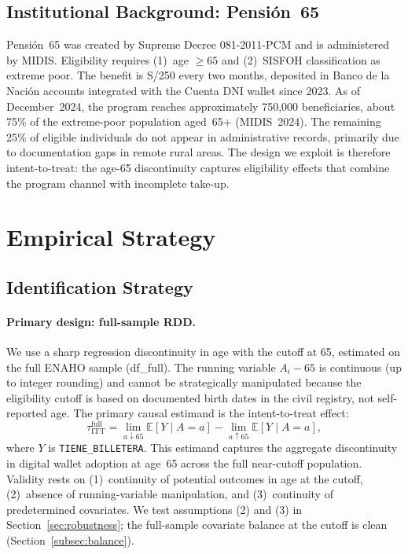 \documentclass[12pt]{article}
\newcommand{\E}{\mathbb{E}}
\begin{document}
\subsection{Institutional Background: Pensi\'on~65}

Pensi\'on~65 was created by Supreme Decree 081-2011-PCM and is
administered by MIDIS. Eligibility requires (1)~age $\ge 65$ and (2)~SISFOH
classification as extreme poor. The benefit is S/250 every two months,
deposited in Banco de la Naci\'on accounts integrated with the Cuenta DNI
wallet since 2023. As of December~2024, the program reaches approximately
750,000 beneficiaries, about 75\% of the extreme-poor population aged~65+
(MIDIS~2024). The remaining 25\% of eligible individuals do not appear in
administrative records, primarily due to documentation gaps in remote rural
areas. The design we exploit is therefore intent-to-treat: the age-65
discontinuity captures eligibility effects that combine the program channel
with incomplete take-up.


\section{Empirical Strategy}
\label{sec:strategy}

\subsection{Identification Strategy}

\paragraph{Primary design: full-sample RDD.}
We use a sharp regression discontinuity in age with the cutoff at 65,
estimated on the full ENAHO sample (df\_full). The running variable
$A_i - 65$ is continuous (up to integer rounding) and cannot be
strategically manipulated because the eligibility cutoff is based on
documented birth dates in the civil registry, not self-reported age. The
primary causal estimand is the intent-to-treat effect:
\begin{equation}
\tau_{\text{ITT}}^{\text{full}}
= \lim_{a \downarrow 65} \E[Y \mid A=a]
- \lim_{a \uparrow 65} \E[Y \mid A=a],
\label{eq:itt_full}
\end{equation}
where $Y$ is \texttt{TIENE\_BILLETERA}. This estimand captures the
aggregate discontinuity in digital wallet adoption at age~65 across the
full near-cutoff population. Validity rests on (1)~continuity of potential
outcomes in age at the cutoff, (2)~absence of running-variable manipulation,
and (3)~continuity of predetermined covariates. We test assumptions (2) and
(3) in Section~\ref{sec:robustness}; the full-sample covariate balance at
the cutoff is clean (Section~\ref{subsec:balance}).
\end{document}
